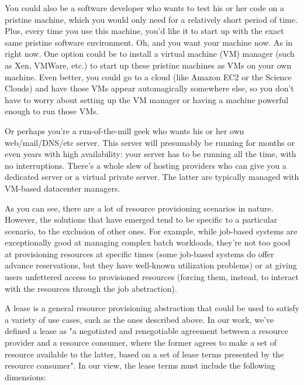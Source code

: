 You could also be a software developer who wants to test his or her code on a pristine machine, which you would only need for a relatively short period of time. Plus, every time you use this machine, you'd like it to start up with the exact same pristine software environment. Oh, and you want your machine now. As in right now. One option could be to install a virtual machine (VM) manager (such as Xen, VMWare, etc.) to start up these pristine machines as VMs on your own machine. Even better, you could go to a cloud (like Amazon EC2 or the Science Clouds) and have those VMs appear automagically somewhere else, so you don't have to worry about setting up the VM manager or having a machine powerful enough to run those VMs.

Or perhaps you're a run-of-the-mill geek who wants his or her own web/mail/DNS/etc server. This server will presumably be running for months or even years with high availability: your server has to be running all the time, with no interruptions. There's a whole slew of hosting providers who can give you a dedicated server or a virtual private server. The latter are typically managed with VM-based datacenter managers.

As you can see, there are a lot of resource provisioning scenarios in nature. However, the solutions that have emerged tend to be specific to a particular scenario, to the exclusion of other ones. For example, while job-based systems are exceptionally good at managing complex batch workloads, they're not too good at provisioning resources at specific times (some job-based systems do offer advance reservations, but they have well-known utilization problems) or at giving users unfettered access to provisioned resources (forcing them, instead, to interact with the resources through the job abstraction).

A lease is a general resource provisioning abstraction that could be used to satisfy a variety of use cases, such as the ones described above. In our work, we've defined a lease as "a negotiated and renegotiable agreement between a resource provider and a resource consumer, where the former agrees to make a set of resource available to the latter, based on a set of lease terms presented by the resource consumer". In our view, the lease terms must include the following dimensions:

